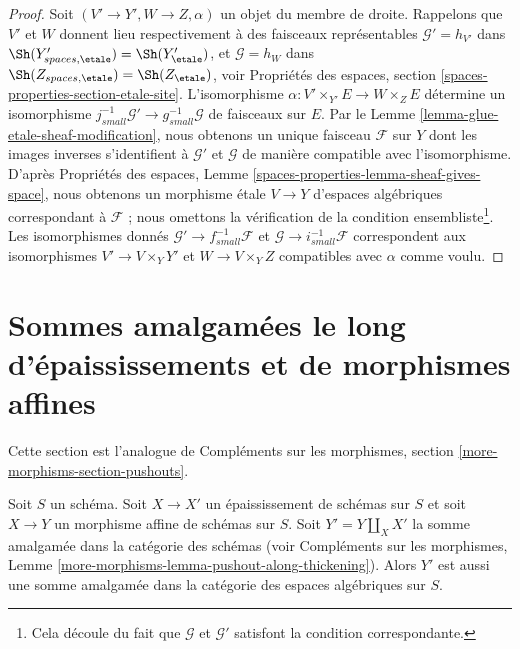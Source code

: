 \begin{proof}
Soit $(V' \to Y', W \to Z, \alpha)$ un objet du membre de droite.
Rappelons que $V'$ et $W$ donnent lieu respectivement à des faisceaux représentables
$\mathcal{G}' = h_{V'}$ dans $\Sh(Y'_{spaces, \etale}) = \Sh(Y'_\etale)$,
et $\mathcal{G} = h_W$
dans $\Sh(Z_{spaces, \etale}) = \Sh(Z_\etale)$, voir
Propriétés des espaces, section \ref{spaces-properties-section-etale-site}.
L'isomorphisme $\alpha : V' \times_{Y'} E \to W \times_Z E$
détermine un isomorphisme
$j_{small}^{-1}\mathcal{G}' \to g_{small}^{-1}\mathcal{G}$ de
faisceaux sur $E$.
Par le Lemme \ref{lemma-glue-etale-sheaf-modification},
nous obtenons un unique faisceau $\mathcal{F}$ sur $Y$ dont les images inverses s'identifient
à $\mathcal{G}'$ et $\mathcal{G}$ de manière compatible avec l'isomorphisme.
D'après Propriétés des espaces, Lemme \ref{spaces-properties-lemma-sheaf-gives-space},
nous obtenons un morphisme \'etale $V \to Y$ d'espaces algébriques
correspondant à $\mathcal{F}$ ; nous omettons la vérification de
la condition ensembliste\footnote{Cela découle du fait que $\mathcal{G}$ et $\mathcal{G}'$ satisfont la condition correspondante.}.
Les isomorphismes donnés $\mathcal{G}' \to f_{small}^{-1}\mathcal{F}$
et $\mathcal{G} \to i_{small}^{-1}\mathcal{F}$
correspondent aux isomorphismes $V' \to V \times_Y Y'$
et $W \to V \times_Y Z$ compatibles
avec $\alpha$ comme voulu.
\end{proof}









\section{Sommes amalgamées le long d'épaississements et de morphismes affines}
\label{section-pushouts}

\noindent
Cette section est l'analogue de
Compléments sur les morphismes, section \ref{more-morphisms-section-pushouts}.

\begin{lemma}
\label{lemma-pushout-along-thickening-schemes}
Soit $S$ un schéma. Soit $X \to X'$ un épaississement de schémas sur $S$ et soit $X \to Y$ un morphisme affine de schémas sur $S$.
Soit $Y' = Y \amalg_X X'$ la somme amalgamée dans la catégorie des schémas (voir
Compléments sur les morphismes, Lemme \ref{more-morphisms-lemma-pushout-along-thickening}).
Alors $Y'$ est aussi une somme amalgamée dans la catégorie des espaces algébriques sur $S$.
\end{lemma}

